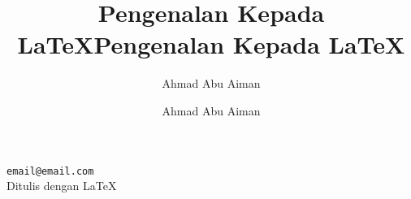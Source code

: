 \documentclass[xcolor=dvipsnames,11pt]{beamer}
\title[tutorial \LaTeX{}]{Pengenalan Kepada \LaTeX{}}
\author[Aiman]{Ahmad Abu Aiman }
\begin{document}
\begin{frame}

\title[Seminar \LaTeX{}, Segambut Dalam]{Pengenalan Kepada \LaTeX{}}
\author[Aiman]{Ahmad Abu Aiman }
\date{}

\titlepage
\begin{center}\texttt{email@email.com}\\
        \textrm{\tiny { Ditulis dengan \LaTeX{}}}
\end{center}


\end{frame}
\end{document}
